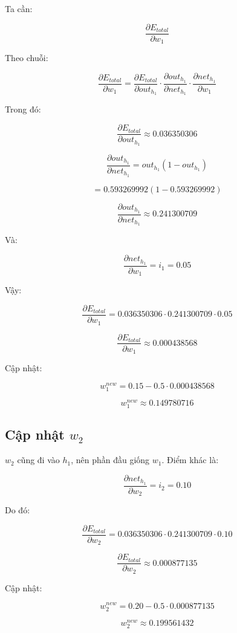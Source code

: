 Ta cần:

\[
    \frac{\partial E_{total}}{\partial w_1}
\]

Theo chuỗi:

\[
    \frac{\partial E_{total}}{\partial w_1}
    =
    \frac{\partial E_{total}}{\partial out_{h_1}}
    \cdot
    \frac{\partial out_{h_1}}{\partial net_{h_1}}
    \cdot
    \frac{\partial net_{h_1}}{\partial w_1}
\]

Trong đó:

\[
    \frac{\partial E_{total}}{\partial out_{h_1}}
    \approx 0.036350306
\]

\[
    \frac{\partial out_{h_1}}{\partial net_{h_1}}
    =
    out_{h_1}(1-out_{h_1})
\]

\[
    =
    0.593269992(1-0.593269992)
\]

\[
    \frac{\partial out_{h_1}}{\partial net_{h_1}}
    \approx 0.241300709
\]

Và:

\[
    \frac{\partial net_{h_1}}{\partial w_1}=i_1=0.05
\]

Vậy:

\[
    \frac{\partial E_{total}}{\partial w_1}
    =
    0.036350306
    \cdot
    0.241300709
    \cdot
    0.05
\]

\[
    \frac{\partial E_{total}}{\partial w_1}
    \approx 0.000438568
\]

Cập nhật:

\[
    w_1^{new}
    =
    0.15
    -
    0.5\cdot 0.000438568
\]

\[
    w_1^{new}
    \approx 0.149780716
\]

\subsection{Cập nhật $w_2$}

$w_2$ cũng đi vào $h_1$, nên phần đầu giống $w_1$. Điểm khác là:

\[
    \frac{\partial net_{h_1}}{\partial w_2}=i_2=0.10
\]

Do đó:

\[
    \frac{\partial E_{total}}{\partial w_2}
    =
    0.036350306
    \cdot
    0.241300709
    \cdot
    0.10
\]

\[
    \frac{\partial E_{total}}{\partial w_2}
    \approx 0.000877135
\]

Cập nhật:

\[
    w_2^{new}
    =
    0.20
    -
    0.5\cdot 0.000877135
\]

\[
    w_2^{new}
    \approx 0.199561432
\]

